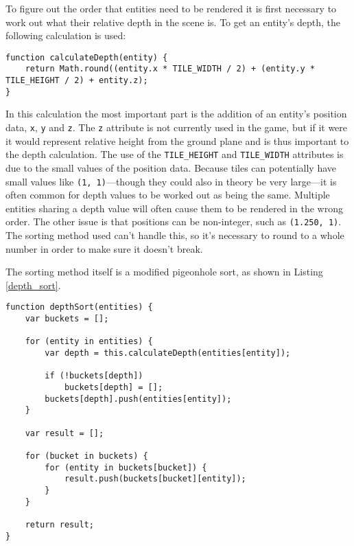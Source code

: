 To figure out the order that entities need to be rendered it is first necessary to work out what their relative depth in the scene is. To get an entity's depth, the following calculation is used:

\noindent
\begin{minipage}{\linewidth}
\begin{lstlisting}[style=js, caption={Calculation to work out an entity's relative depth in the scene.}, label=calculate_depth]
function calculateDepth(entity) {
    return Math.round((entity.x * TILE_WIDTH / 2) + (entity.y * TILE_HEIGHT / 2) + entity.z);
}
\end{lstlisting}
\end{minipage}

In this calculation the most important part is the addition of an entity's position data, \texttt{x}, \texttt{y} and \texttt{z}. The \texttt{z} attribute is not currently used in the game, but if it were it would represent relative height from the ground plane and is thus important to the depth calculation. The use of the \texttt{TILE\_HEIGHT} and \texttt{TILE\_WIDTH} attributes is due to the small values of the position data. Because tiles can potentially have small values like \texttt{(1, 1)}---though they could also in theory be very large---it is often common for depth values to be worked out as being the same. Multiple entities sharing a depth value will often cause them to be rendered in the wrong order. The other issue is that positions can be non-integer, such as \texttt{(1.250, 1)}. The sorting method used can't handle this, so it's necessary to round to a whole number in order to make sure it doesn't break.

The sorting method itself is a modified pigeonhole sort, as shown in Listing \ref{depth_sort}.

\noindent
\begin{minipage}{\linewidth}
\begin{lstlisting}[style=js, caption={Depth sorting entities in a scene using a modified pigeonhole sort.}, label=depth_sort]
function depthSort(entities) {
    var buckets = [];

    for (entity in entities) {
        var depth = this.calculateDepth(entities[entity]);

        if (!buckets[depth])
            buckets[depth] = [];
        buckets[depth].push(entities[entity]);
    }

    var result = [];

    for (bucket in buckets) {
        for (entity in buckets[bucket]) {
            result.push(buckets[bucket][entity]);
        }
    }

    return result;
}
\end{lstlisting}
\end{minipage}

